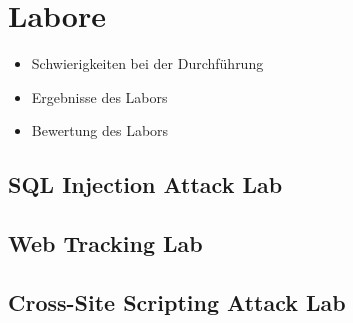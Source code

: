 \appendix
\chapter{Labore}
\begin{itemize}
	\item Schwierigkeiten bei der Durchführung
	\item Ergebnisse des Labors
	\item Bewertung des Labors
\end{itemize}
\section{SQL Injection Attack Lab}
\section{Web Tracking Lab}
\section{Cross-Site Scripting Attack Lab}